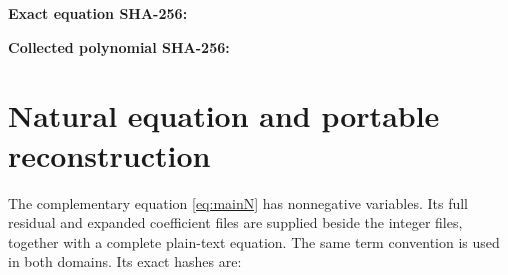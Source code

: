 \documentclass[11pt]{article}
\theoremstyle{remark}\newtheorem{remark}[theorem]{Remark}
\begin{document}
\textbf{Exact equation SHA-256:}\par
{\small\ttfamily\IntEquationHash}\par
\textbf{Collected polynomial SHA-256:}\par
{\small\ttfamily\IntPolynomialHash}\par

\begingroup\small
\setlength{\abovedisplayskip}{4pt}\setlength{\belowdisplayskip}{4pt}
\allowdisplaybreaks[4]

\endgroup

\section{Natural equation and portable reconstruction}

The complementary equation \eqref{eq:mainN} has \NatVars{} nonnegative variables. Its full residual and expanded coefficient files are supplied beside the integer files, together with a complete plain-text equation. The same term convention is used in both domains. Its exact hashes are:
\begin{description}[style=nextline]
\item[Residual equation] {\small\ttfamily\NatEquationHash}
\item[Collected polynomial] {\small\ttfamily\NatPolynomialHash}
\end{description}


\end{document}
